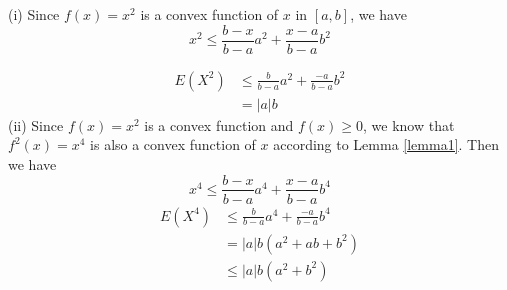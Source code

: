 \documentclass[journal]{IEEEtran}
\begin{document}
\begin{IEEEproof}
(i) Since $f(x)=x^2$ is a convex function of $x$ in $[a,b]$,  we have
\begin{equation}
  x^2\leq\frac{b-x}{b-a}a^2+\frac{x-a}{b-a}b^2
\end{equation}

\begin{equation}
\begin{split}
  E(X^2){} &\leq \frac{b}{b-a}a^2+\frac{-a}{b-a}b^2{}\\
  & =|a|b
\end{split}
\end{equation}
(ii)
Since $f(x)=x^2$ is a convex function and $f(x)\geq 0$, we know that $f^2(x)=x^4$ is also a convex function of $x$ according to Lemma \ref{lemma1}. Then we have
\begin{equation}\label{x4 estimate}
  x^4\leq\frac{b-x}{b-a}a^4+\frac{x-a}{b-a}b^4
\end{equation}
\begin{equation}
\begin{split}
  E(X^4){} &\leq \frac{b}{b-a}a^4+\frac{-a}{b-a}b^4{}\\
 & =|a|b (a^2+ab+b^2)\\
 & \leq |a| b(a^2+b^2)
\end{split}
\end{equation}
\end{IEEEproof}
\end{document}
